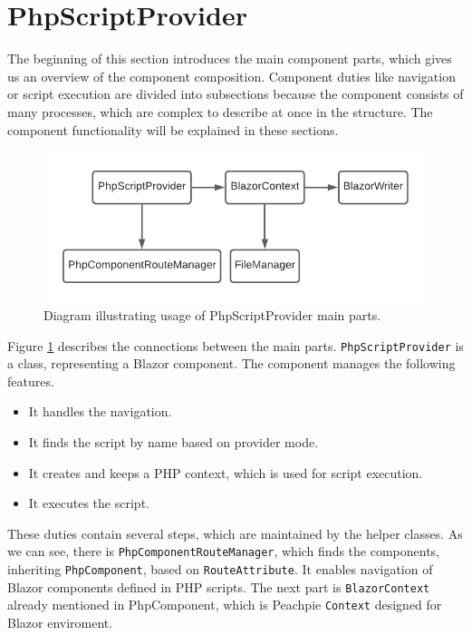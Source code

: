 \section{PhpScriptProvider}

The beginning of this section introduces the main component parts, which gives us an overview of the component composition.
Component duties like navigation or script execution are divided into subsections because the component consists of many processes, which are complex to describe at once in the structure.
The component functionality will be explained in these sections.
\par
\begin{figure}[b!]
\centering
\includegraphics[scale=0.8]{./img/PhpScriptProvider}
\caption{Diagram illustrating usage of PhpScriptProvider main parts.}
\label{img18:provider}
\end{figure}
\par
Figure \ref{img18:provider} describes the connections between the main parts.
\texttt{PhpScriptProvider} is a class, representing a Blazor component.
The component manages the following features.
\par
\begin{itemize}
\item It handles the navigation.
\item It finds the script by name based on provider mode.
\item It creates and keeps a PHP context, which is used for script execution.
\item It executes the script.
\end{itemize}
\par
These duties contain several steps, which are maintained by the helper classes.
As we can see, there is \texttt{PhpComponentRouteManager}, which finds the components, inheriting \texttt{PhpComponent}, based on \texttt{RouteAttribute}.
It enables navigation of Blazor components defined in PHP scripts.
The next part is \texttt{BlazorContext} already mentioned in PhpComponent, which is Peachpie \texttt{Context} designed for Blazor enviroment.
